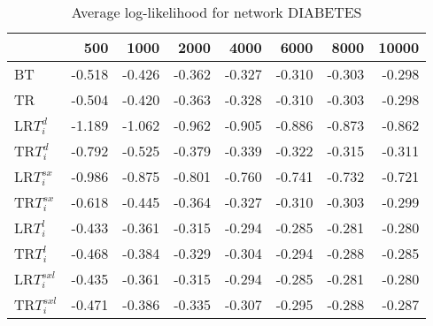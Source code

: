 \begin{table}
 \begin{center}
 \begin{tabular}{lrrrrrrr}
 & 500 & 1000 & 2000 & 4000 & 6000 & 8000 & 10000\\\hline
BT & -0.518 & -0.426 & -0.362 & -0.327 & -0.310 & -0.303 & -0.298\\\hline
TR & -0.504 & -0.420 & -0.363 & -0.328 & -0.310 & -0.303 & -0.298\\\hline
LR$T_i^d$ & -1.189 & -1.062 & -0.962 & -0.905 & -0.886 & -0.873 & -0.862\\\hline
TR$T_i^d$ & -0.792 & -0.525 & -0.379 & -0.339 & -0.322 & -0.315 & -0.311\\\hline
LR$T_i^{sx}$ & -0.986 & -0.875 & -0.801 & -0.760 & -0.741 & -0.732 & -0.721\\\hline
TR$T_i^{sx}$ & -0.618 & -0.445 & -0.364 & -0.327 & -0.310 & -0.303 & -0.299\\\hline
LR$T_i^l$ & -0.433 & -0.361 & -0.315 & -0.294 & -0.285 & -0.281 & -0.280\\\hline
TR$T_i^l$ & -0.468 & -0.384 & -0.329 & -0.304 & -0.294 & -0.288 & -0.285\\\hline
LR$T_i^{sxl}$ & -0.435 & -0.361 & -0.315 & -0.294 & -0.285 & -0.281 & -0.280\\\hline
TR$T_i^{sxl}$ & -0.471 & -0.386 & -0.335 & -0.307 & -0.295 & -0.288 & -0.287\\\hline
\end{tabular}
\end{center}
\caption{Average log-likelihood for network DIABETES }
\label{Diabetesll}
\end{table}



